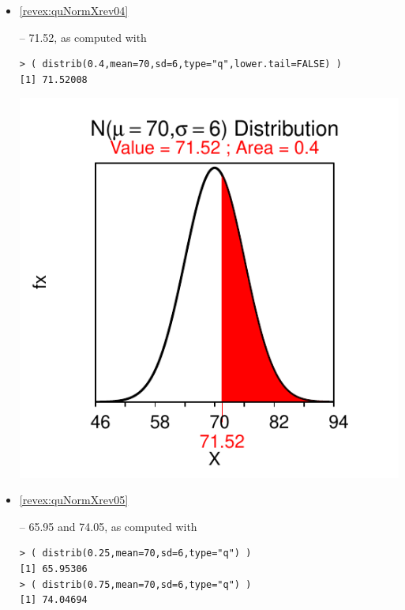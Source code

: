 \documentclass[10pt,openany]{book}\usepackage[]{graphicx}\usepackage[]{color}
\makeatletter
\newenvironment{kframe}{%
 \def\at@end@of@kframe{}%
 \ifinner\ifhmode%
  \def\at@end@of@kframe{\end{minipage}}%
  \begin{minipage}{\columnwidth}%
 \fi\fi%
 \def\FrameCommand##1{\hskip\@totalleftmargin \hskip-\fboxsep
 \colorbox{shadecolor}{##1}\hskip-\fboxsep
     \hskip-\linewidth \hskip-\@totalleftmargin \hskip\columnwidth}%
 \MakeFramed {\advance\hsize-\width
   \@totalleftmargin\z@ \linewidth\hsize
   \@setminipage}}%
 {\par\unskip\endMakeFramed%
 \at@end@of@kframe}
\newenvironment{knitrout}{}{} %
\makeatother
\begin{document}
\begin{itemize}
\begin{knitrout}
{}



\end{knitrout}
  \item \hypertarget{ans:quNormXrev04}{\ref{revex:quNormXrev04}} -- 71.52, as computed with
\begin{knitrout}
\color{fgcolor}\begin{kframe}
\begin{verbatim}
> ( distrib(0.4,mean=70,sd=6,type="q",lower.tail=FALSE) )
[1] 71.52008
\end{verbatim}
\end{kframe}

{\centering \includegraphics[width=.4\linewidth]{Figs/unnamed-chunk-222-1} 

}



\end{knitrout}
  \item \hypertarget{ans:quNormXrev05}{\ref{revex:quNormXrev05}} -- 65.95 and 74.05, as computed with
\begin{knitrout}
\color{fgcolor}\begin{kframe}
\begin{verbatim}
> ( distrib(0.25,mean=70,sd=6,type="q") )
[1] 65.95306
> ( distrib(0.75,mean=70,sd=6,type="q") )
[1] 74.04694
\end{verbatim}
\end{kframe}


\end{knitrout}
\end{itemize}
\end{document}
